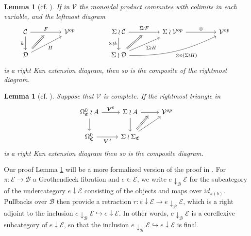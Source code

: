 \documentclass[a4paper,10pt
,draft
]{article}%
\numberwithin{equation}{section}
\numberwithin{figure}{section}
\newtheorem{lemma}[equation]{Lemma}%
\theoremstyle{definition} %
\newcommand{\1}{\ensuremath{\mathbbm 1}}%
\begin{document}
\begin{lemma}[{cf. \cite[Lemma 2.21]{BP_geo}}]
	\label{FINWRPRODLIM LEM}
	If in $\mathcal{V}$ the monoidal product %
	commutes with colimits in each variable, and the leftmost diagram
	\begin{equation}\label{WRLAN EQ}
	\begin{tikzcd}[column sep = 4.5em]
	\mathcal{C} \ar{r}[swap,name=F]{}{F} \ar{d}[swap]{k} & 
	\mathcal{V}^{op} 
& 
	\Sigma \wr \mathcal{C} \ar{d}[swap]{\Sigma \wr k} 
	\ar{r}[swap,name=FF]{}{\Sigma \wr F} & 
	\Sigma \wr \mathcal{V}^{op} \ar{r}{\otimes} &
	\mathcal{V}^{op}
\\
	|[alias=D]|\mathcal{D} \ar{ru}[swap]{H} &
& 
	|[alias=FD]|\Sigma \wr \mathcal{D}
	\ar{ru}[swap]{\Sigma \wr H}
	\ar[bend right=13]{rru}[swap]{\otimes \circ (\Sigma \wr H)}
	&
	\arrow[Rightarrow, from=D, to=F,shorten <=0.10cm]%
	\arrow[Rightarrow, from=FD, to=FF,shorten <=0.10cm]
	\end{tikzcd}
	\end{equation}
	is a right Kan extension diagram,
	then so is the composite of the rightmost diagram. 
\end{lemma}




\begin{lemma}[{cf. \cite[Lemma 4.27]{BP_geo}}]
	\label{LANPULLCOMA LEM}
	Suppose that $\mathcal{V}$ is complete. If the rightmost triangle in 
	\[
	\begin{tikzcd}
	\Omega_{\mathfrak{C}}^{0} \wr A \ar{r}{\boldsymbol{V}^0} 
	\ar{d} & 
	\Sigma \wr A  
	\ar{d}  \ar{r}[swap,name=F]{}&
	\mathcal{V}^{op}
	\\
	\Omega_{\mathfrak{C}}^{0} \ar{r}[swap]{\boldsymbol{V}^0} & 
	|[alias=FEG]|\Sigma \wr \Sigma_{\mathfrak{C}} \ar{ru}
	\arrow[Rightarrow, from=FEG, to=F,shorten <=0.15cm]
	\end{tikzcd}
	\]
	is a right Kan extension diagram then so is the composite diagram.
\end{lemma}



Our proof Lemma \ref{LANPULLCOMA LEM} will be a more formalized version of the proof in \cite[Lemma 4.27]{BP_geo}.
For 
$\pi \colon \mathcal{E} \to \mathcal{B}$
a Grothendieck fibration and $e \in \mathcal{E}$,
we write $e \downarrow_{\mathcal{B}} \mathcal{E}$
for the subcategory of the undercategory
$e \downarrow \mathcal{E}$
consisting of the objects and maps
over $id_{\pi(b)}$.
Pullbacks over $\mathcal{B}$ 
then provide a retraction 
$r \colon e \downarrow \mathcal{E} \to
e \downarrow_{\mathcal{B}} \mathcal{E}$,
which is a right adjoint to the inclusion
$e \downarrow_{\mathcal{B}} \mathcal{E} 
\hookrightarrow
e \downarrow \mathcal{E}$.
In other words, 
$e \downarrow_{\mathcal{B}} \mathcal{E} $
is a coreflexive subcategory of 
$e \downarrow \mathcal{E} $,
so that the inclusion
$e \downarrow_{\mathcal{B}} \mathcal{E} 
\hookrightarrow
e \downarrow \mathcal{E}$
is final.
\end{document}
